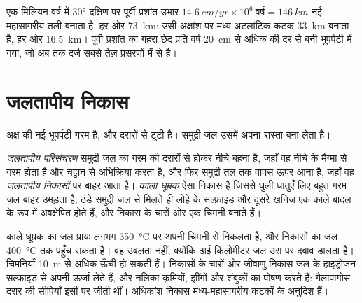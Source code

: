 \begin{example}[एक धीमा और एक तेज़ कटक]\label{ex:g11:ocean-ridges:rates}
एक मिलियन वर्ष में \ang{30} दक्षिण पर पूर्वी प्रशांत उभार
$\qty{14.6}{cm/yr} \times 10^6\ \text{वर्ष} = \qty{146}{km}$ नई महासागरीय
तली बनाता है, हर ओर \qty{73}{km}; उसी अक्षांश पर मध्य-अटलांटिक कटक
\qty{33}{km} बनाता है, हर ओर \qty{16.5}{km}। पूर्वी
प्रशांत का गहरा छेद प्रति वर्ष \qty{20}{cm} से अधिक की दर से बनी भूपर्पटी में गया,
जो अब तक दर्ज सबसे तेज़ प्रसरणों में से है।
\end{example}

\section{जलतापीय निकास}

अक्ष की नई भूपर्पटी गरम है, और दरारों से टूटी है। समुद्री जल
उसमें अपना रास्ता बना लेता है।

\begin{definition}\label{def:g11:ocean-ridges:hydrothermal}
\emph{जलतापीय परिसंचरण} समुद्री जल का
गरम  की दरारों से होकर नीचे बहना है, जहाँ वह
नीचे के मैग्मा से गरम होता है और चट्टान से अभिक्रिया करता है, और फिर समुद्री
तल तक वापस ऊपर आना है, जहाँ वह \emph{जलतापीय निकासों} पर बाहर आता है। \emph{काला
धूम्रक} ऐसा निकास है जिससे घुली धातुएँ लिए बहुत गरम जल
बाहर उमड़ता है; ठंडे समुद्री जल से मिलते ही लोहे के सल्फ़ाइड और
दूसरे खनिज एक काले बादल के रूप में अवक्षेपित होते हैं, और निकास के चारों ओर एक चिमनी
बनाते हैं।
\end{definition}

काले धूम्रक का जल प्रायः लगभग \qty{350}{\celsius} पर अपनी चिमनी से निकलता है,
और निकासों का जल \qty{400}{\celsius} तक पहुँच सकता है। वह
उबलता नहीं, क्योंकि ढाई किलोमीटर जल उस पर दबाव डालता है।
चिमनियाँ \qty{10}{m} से अधिक ऊँची हो सकती हैं। निकासों के चारों ओर जीवाणु
निकास-जल के हाइड्रोजन सल्फ़ाइड से अपनी ऊर्जा लेते हैं, और नलिका-कृमियों,
झींगों और शंबुकों का पोषण करते हैं: गैलापागोस दरार की सीपियाँ इसी पर जीती थीं। अधिकांश
निकास मध्य-महासागरीय कटकों के अनुदिश हैं।

